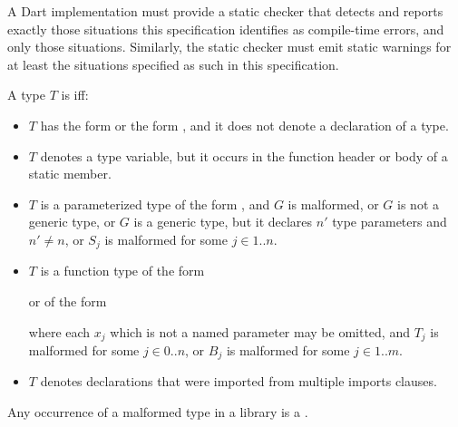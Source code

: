 \documentclass[makeidx]{article}
\begin{document}
\LMHash{}%
A Dart implementation must provide a static checker that detects and reports
exactly those situations this specification identifies as compile-time errors,
and only those situations.
Similarly, the static checker must emit static warnings
for at least the situations specified as such in this specification.


\LMHash{}%
A type $T$ is  if{}f:
\begin{itemize}
\item
  $T$ has the form \id{} or the form ,
  and it does not denote a declaration of a type.
\item
  $T$ denotes a type variable,
  but it occurs in the function header or body of a static member.
\item
  $T$ is a parameterized type of the form ,
  and $G$ is malformed,
  or $G$ is not a generic type,
  or $G$ is a generic type,
  but it declares $n'$ type parameters and $n' \not= n$,
  or $S_j$ is malformed for some $j \in 1 .. n$.
\item
  $T$ is a function type of the form



  \noindent
  or of the form



  \noindent
  where each $x_j$ which is not a named parameter may be omitted,
  and $T_j$ is malformed for some $j \in 0 .. n$,
  or $B_j$ is malformed for some $j \in 1 .. m$.
\item
  $T$ denotes declarations that were imported from multiple imports clauses.
\end{itemize}

\LMHash{}%
Any occurrence of a
malformed type in a library is a .
\end{document}
